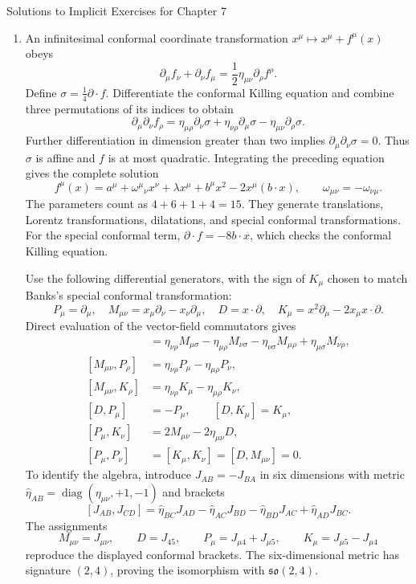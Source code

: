 \begin{bankssolutions}{Solutions to Implicit Exercises for Chapter 7}
\begin{enumerate}[label=(\alph*)]
\item An infinitesimal conformal coordinate transformation
$x^\mu\mapsto x^\mu+f^\mu(x)$ obeys
\begin{equation*}
 \partial_\mu f_\nu+\partial_\nu f_\mu
 =\frac12\eta_{\mu\nu}\partial_\rho f^\rho.
\end{equation*}
Define $\sigma=\frac14\partial\cdot f$.  Differentiate the conformal Killing
equation and combine three permutations of its indices to obtain
\[
 \partial_\mu\partial_\nu f_\rho
 =\eta_{\mu\rho}\partial_\nu\sigma
 +\eta_{\nu\rho}\partial_\mu\sigma
 -\eta_{\mu\nu}\partial_\rho\sigma.
\]
Further differentiation in dimension greater than two implies
$\partial_\mu\partial_\nu\sigma=0$.  Thus $\sigma$ is affine and $f$ is at
most quadratic.  Integrating the preceding equation gives the complete
solution
\begin{equation*}
 f^\mu(x)=a^\mu+\omega^\mu{}_{\nu}x^\nu+\lambda x^\mu
 +b^\mu x^2-2x^\mu(b\cdot x),
 \qquad \omega_{\mu\nu}=-\omega_{\nu\mu}.
\end{equation*}
The parameters count as $4+6+1+4=15$.  They generate translations, Lorentz
transformations, dilatations, and special conformal transformations.  For
the special conformal term,
$\partial\cdot f=-8b\cdot x$, which checks the conformal Killing equation.

Use the following differential generators, with the sign of $K_\mu$ chosen
to match Banks's special conformal transformation:
\[
 P_\mu=\partial_\mu,\quad
 M_{\mu\nu}=x_\mu\partial_\nu-x_\nu\partial_\mu,\quad
 D=x\cdot\partial,\quad
 K_\mu=x^2\partial_\mu-2x_\mu x\cdot\partial.
\]
Direct evaluation of the vector-field commutators gives
\begin{align*}
 [M_{\mu\nu},M_{\rho\sigma}]
 & =\eta_{\nu\rho}M_{\mu\sigma}
 -\eta_{\mu\rho}M_{\nu\sigma}
 -\eta_{\nu\sigma}M_{\mu\rho}
 +\eta_{\mu\sigma}M_{\nu\rho},\\
 [M_{\mu\nu},P_\rho]
 &=\eta_{\nu\rho}P_\mu-\eta_{\mu\rho}P_\nu,\\
 [M_{\mu\nu},K_\rho]
 &=\eta_{\nu\rho}K_\mu-\eta_{\mu\rho}K_\nu,\\
 [D,P_\mu]&=-P_\mu,\qquad [D,K_\mu]=K_\mu,\\
 [P_\mu,K_\nu]&=2M_{\mu\nu}-2\eta_{\mu\nu}D,\\
 [P_\mu,P_\nu]&=[K_\mu,K_\nu]=[D,M_{\mu\nu}]=0.
\end{align*}
To identify the algebra, introduce $J_{AB}=-J_{BA}$ in six dimensions with
metric
$\widehat\eta_{AB}=\operatorname{diag}(\eta_{\mu\nu},+1,-1)$ and brackets
\[
 [J_{AB},J_{CD}]
 =\widehat\eta_{BC}J_{AD}-\widehat\eta_{AC}J_{BD}
 -\widehat\eta_{BD}J_{AC}+\widehat\eta_{AD}J_{BC}.
\]
The assignments
\[
 M_{\mu\nu}=J_{\mu\nu},\qquad D=J_{45},\qquad
 P_\mu=J_{\mu4}+J_{\mu5},\qquad
 K_\mu=J_{\mu5}-J_{\mu4}
\]
reproduce the displayed conformal brackets.  The six-dimensional metric has
signature $(2,4)$, proving the isomorphism with $\mathfrak{so}(2,4)$.


\end{enumerate}
\end{bankssolutions}
